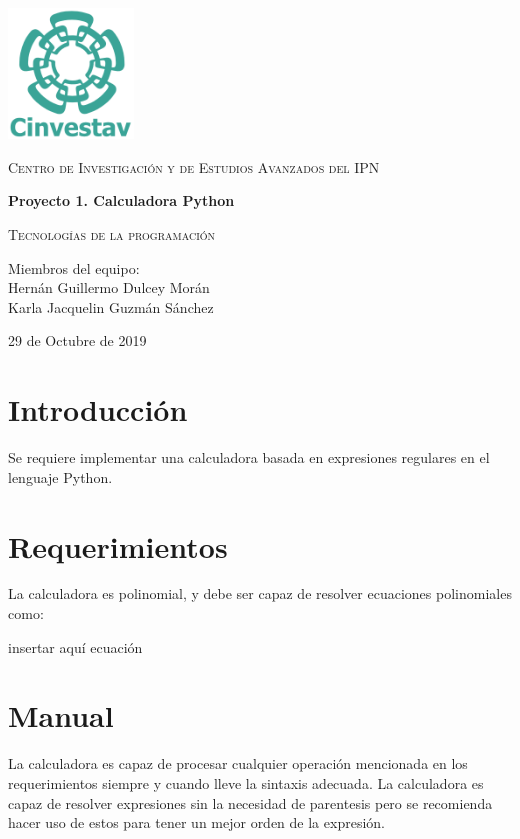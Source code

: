 \documentclass[10pt]{report}
\begin{document}
\begin{titlepage}
	\centering
	\includegraphics[width=0.25\textwidth]{LogoCinvesHeader.png}\par\vspace{2cm}
	{\scshape\LARGE Centro de Investigación y de Estudios Avanzados del IPN\par}
	\vspace{2cm}	
	{\huge\bfseries Proyecto 1. Calculadora Python \par}
	\vspace{1.5cm}
	{\scshape\Large Tecnologías de la programación\par}
	\vspace{2cm}
	{\Large Miembros del equipo: \\Hernán Guillermo Dulcey Morán \\Karla Jacquelin Guzmán Sánchez\par}
	\vfill

	{\large 29 de Octubre de 2019 \par}
\end{titlepage}

\section*{Introducción}
Se requiere implementar una calculadora basada en expresiones regulares en el lenguaje Python.

\section*{Requerimientos}
La calculadora es polinomial, y debe ser capaz de resolver ecuaciones polinomiales como:

insertar aquí ecuación

\section*{Manual}
La calculadora es capaz de procesar cualquier operación mencionada en los requerimientos siempre y cuando lleve la sintaxis adecuada. La calculadora es capaz de resolver expresiones sin la necesidad de parentesis pero se recomienda hacer uso de estos para tener un mejor orden de la expresión.
\end{document}
